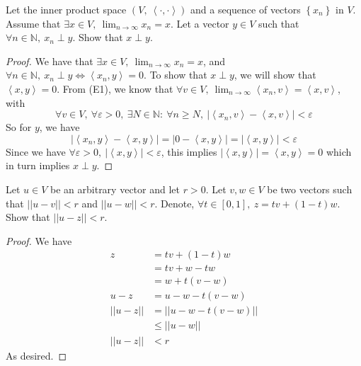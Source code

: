 \documentclass{article}
\newcommand{\gnorm}[1]{\left|\left|#1\right|\right|}
\newcommand{\abs}[1]{\left|#1\right|}
\newcommand{\parens}[1]{\left(#1\right)}
\newcommand{\bracks}[1]{\left\{#1\right\}}
\newcommand{\sqbracks}[1]{\left[#1\right]}
\newcommand{\vep}{\varepsilon}
\newcommand{\N}{\mathbb{N}}
\newcommand{\abracks}[1]{\left< #1\right>}
\begin{document}
	\item Let the inner product space $\parens{V,\ \abracks{\cdot,\cdot}}$ and a sequence of vectors $\bracks{x_n}$ in $V$. Assume that $\exists x \in V,\ \lim_{n\to\infty} x_n = x$. Let a vector $y \in V$ such that $\forall n \in \N,\ x_n \perp y$. Show that $x\perp y$.
	\begin{proof}
	We have that $\exists x \in V,\ \lim_{n\to\infty} x_n = x$, and $\forall n \in \N,\ x_n \perp y \iff \abracks{x_n, y} = 0$. To show that $x \perp y$, we will show that $\abracks{x,y} = 0$. From (E1), we know that $\forall v \in V,\ \lim_{n\to\infty}\abracks{x_n,v} = \abracks{x,v}$, with 
	$$\forall v \in V,\ \forall \vep > 0 ,\ \exists N \in \N:\ \forall n \geq N,\ \abs{\abracks{x_n, v} - \abracks{x,v}} < \vep$$
	So for $y$, we have
	$$
	\abs{\abracks{x_n, y} - \abracks{x,y}} = \abs{0-\abracks{x,y}} = \abs{\abracks{x,y}} < \vep
	$$
	Since we have $\forall \vep > 0,\ \abs{\abracks{x,y}} < \vep$, this implies $\abs{\abracks{x,y}} = \abracks{x,y} = 0$ which in turn implies $x \perp y$.
	\end{proof}
	
	\item Let $u \in V$ be an arbitrary vector and let $r > 0$. Let $v, w \in V$ be two vectors such that $\gnorm{u-v} < r$ and $\gnorm{u-w} < r$. Denote, $\forall t \in \sqbracks{0,1},\ z = tv + (1-t)w$. Show that $\gnorm{u-z} < r$.
	\begin{proof}
	We have 
	\begin{align*}
	z &= tv + (1-t)w \\
	 &= tv + w -tw \\
	 &= w + t(v-w) \\
	u - z &= u -w - t(v-w) \\
	\gnorm{u - z} &= \gnorm{u -w - t(v-w)} \\
	&\leq \gnorm{u -w} \\
	\gnorm{u - z}&< r
	\end{align*}
	As desired.
	\end{proof}
	
\end{document}
